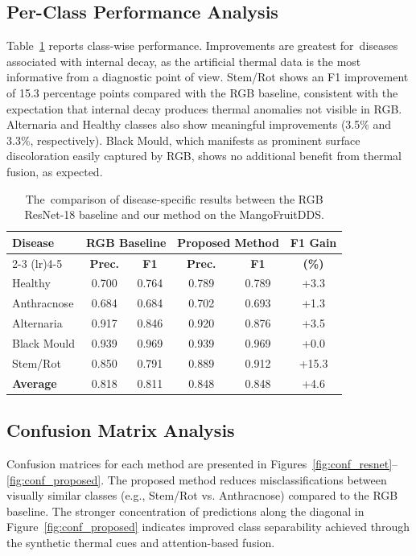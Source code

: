 \documentclass[utf8]{FrontiersinHarvard} %
\begin{document}
\subsection{Per-Class Performance Analysis}
Table~\ref{tab:perclass} reports class-wise performance. Improvements are greatest for diseases associated with internal decay, as the artificial thermal data is the most informative from a diagnostic point of view. Stem/Rot shows an F1 improvement of 15.3 percentage points compared with the RGB baseline, consistent with the expectation that internal decay produces thermal anomalies not visible in RGB. Alternaria and Healthy classes also show meaningful improvements (3.5\% and 3.3\%, respectively). Black Mould, which manifests as prominent surface discoloration easily captured by RGB, shows no additional benefit from thermal fusion, as expected.

\begin{table}[h!]
    \caption{The comparison of disease-specific results between the RGB ResNet-18 baseline and our method on the MangoFruitDDS.}
    \label{tab:perclass}
    \raggedright
    \scriptsize
    \begin{tabular}{lccccc}
        \toprule
        \multirow{2}{*}{\textbf{Disease}} & \multicolumn{2}{c}{\textbf{RGB Baseline}} & \multicolumn{2}{c}{\textbf{Proposed Method}} & \textbf{F1 Gain} \\
        \cmidrule(lr){2-3} \cmidrule(lr){4-5}
         & \textbf{Prec.} & \textbf{F1} & \textbf{Prec.} & \textbf{F1} & \textbf{(\%)} \\
        \midrule
        Healthy & 0.700 & 0.764 & 0.789 & 0.789 & +3.3 \\
        Anthracnose & 0.684 & 0.684 & 0.702 & 0.693 & +1.3 \\
        Alternaria & 0.917 & 0.846 & 0.920 & 0.876 & +3.5 \\
        Black Mould & 0.939 & 0.969 & 0.939 & 0.969 & +0.0 \\
        Stem/Rot & 0.850 & 0.791 & 0.889 & 0.912 & +15.3 \\
        \midrule
        \textbf{Average} & 0.818 & 0.811 & 0.848 & 0.848 & +4.6 \\
        \bottomrule
    \end{tabular}
\end{table}

\subsection{Confusion Matrix Analysis}
Confusion matrices for each method are presented in Figures~\ref{fig:conf_resnet}--\ref{fig:conf_proposed}. The proposed method reduces misclassifications between visually similar classes (e.g., Stem/Rot vs. Anthracnose) compared to the RGB baseline. The stronger concentration of predictions along the diagonal in Figure~\ref{fig:conf_proposed} indicates improved class separability achieved through the synthetic thermal cues and attention-based fusion.
\end{document}
